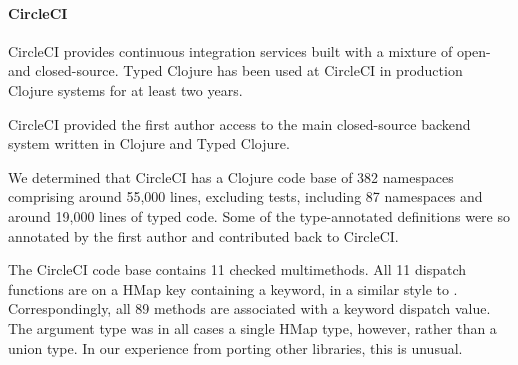 \paragraph{CircleCI}
CircleCI %
provides continuous integration services built with a mixture of open-
and closed-source.
Typed Clojure has been used at CircleCI in production Clojure systems for at least two years.

CircleCI provided the first author access to the main closed-source backend system written in Clojure
and Typed Clojure.

We determined that
CircleCI has a Clojure code base of
382 namespaces comprising around 55,000 lines, excluding tests, including 87 namespaces
and around 19,000 lines of typed code.
Some of the type-annotated definitions were so annotated by the first
author and contributed back to CircleCI.
%

%

The CircleCI code base contains 11 checked multimethods.
 All 11 dispatch functions
are on a HMap key containing a keyword, in a similar style to
.
Correspondingly, all 89 methods are associated with a keyword dispatch value.
The argument type was in all cases a single HMap type, however,
rather than a union type.
In our experience from porting other libraries, this is unusual.

